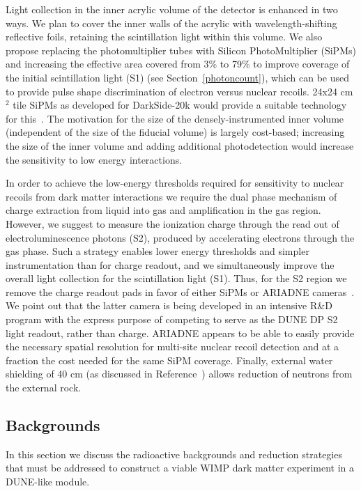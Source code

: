 \documentclass[a4paper,11pt]{article}
\begin{document}
Light collection in the inner acrylic volume of the detector is enhanced in two ways. We plan to cover the inner walls of the acrylic with wavelength-shifting reflective foils, retaining the scintillation light within this volume. We also propose replacing the photomultiplier tubes with Silicon PhotoMultiplier (SiPMs) and increasing the effective area covered from 3\% to 79\% to improve coverage of the initial scintillation light (S1) (see Section~\ref{photoncount}), which can be used to provide pulse shape discrimination of electron versus nuclear recoils. 24x24 cm$^2$ tile SiPMs as developed for DarkSide-20k would provide a suitable technology for this~\cite{darkside_sipm}. The motivation for the size of the densely-instrumented inner volume (independent of the size of the fiducial volume) is largely cost-based; increasing the size of the inner volume and adding additional photodetection would increase the sensitivity to low energy interactions.

In order to achieve the low-energy thresholds required for sensitivity to nuclear recoils from dark matter interactions we require the dual phase mechanism of charge extraction from liquid into gas and amplification in the gas region.  However, we suggest to measure the ionization charge through the read out of electroluminescence photons (S2), produced by accelerating electrons through the gas phase. Such a strategy enables lower energy thresholds and simpler instrumentation than for charge readout, and we simultaneously improve the overall light collection for the scintillation light (S1). Thus, for the S2 region we remove the charge readout pads in favor of either SiPMs or ARIADNE cameras~\cite{ARIADNE}. We point out that the latter camera is being developed in an intensive R\&D program with the express purpose of competing to serve as the DUNE DP S2 light readout, rather than charge. ARIADNE appears to be able to easily provide the necessary spatial resolution for  multi-site nuclear recoil detection and at a fraction the cost needed for the same SiPM coverage. Finally, external water shielding of 40 cm (as discussed in Reference~\cite{beacom_bkd}) allows reduction of neutrons from the external rock.

\subsection{Backgrounds}
In this section we discuss the radioactive backgrounds and reduction strategies that must be addressed to construct a viable WIMP dark matter experiment in a DUNE-like module.
\end{document}
